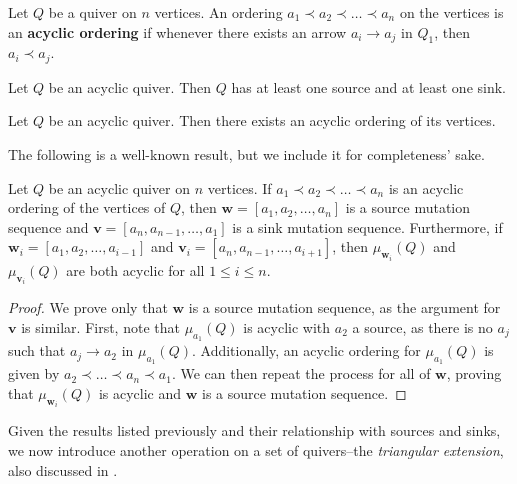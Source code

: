 \documentclass[ALCO,Unicode]{cedram}
\newcommand{\bw}{{\boldsymbol{w}}}
\newcommand{\bv}{{\boldsymbol{v}}}
\begin{document}
\begin{defi}{\cite{MR3822733}} \label{def-acyclic-ordering}
    Let $Q$ be a quiver on $n$ vertices.
    An ordering $a_1 \prec a_2 \prec \dots \prec a_n$ on the vertices is an \textbf{acyclic ordering} if whenever there exists an arrow $a_i \to a_j$ in $Q_1$, then $a_i \prec a_j$.
\end{defi}

\begin{prop}{\cite[Proposition 3.1.1]{MR3822733}} \label{prop-acyclic-source-sink}
    Let $Q$ be an acyclic quiver.
    Then $Q$ has at least one source and at least one sink.
\end{prop}

\begin{prop}{\cite[Proposition 3.1.2]{MR3822733}} \label{prop-acyclic-ordering}
    Let $Q$ be an acyclic quiver.
    Then there exists an acyclic ordering of its vertices.
\end{prop}

The following is a well-known result, but we include it for completeness' sake.

\begin{lemm} \label{lem-acyclic-source-sink}
    Let $Q$ be an acyclic quiver on $n$ vertices.
    If $a_1 \prec a_2 \prec \dots \prec a_n$ is an acyclic ordering of the vertices of $Q$, then $\bw = [a_1, a_2, \dots, a_n]$ is a source mutation sequence and $\bv = [a_n, a_{n-1}, \dots, a_1]$ is a sink mutation sequence.
    Furthermore, if $\bw_i = [a_1, a_2, \dots, a_{i-1}]$ and $\bv_i = [a_n, a_{n-1}, \dots, a_{i+1}]$, then $\mu_{\bw_i}(Q)$ and $\mu_{\bv_i}(Q)$ are both acyclic for all $1 \leq i \leq n$.
\end{lemm}


\begin{proof}
    We prove only that $\bw$ is a source mutation sequence, as the argument for $\bv$ is similar.
    First, note that $\mu_{a_1}(Q)$ is acyclic with $a_2$ a source, as there is no $a_j$ such that $a_j \to a_2$ in $\mu_{a_1}(Q)$.
    Additionally, an acyclic ordering for $\mu_{a_1}(Q)$ is given by $a_2 \prec \dots \prec a_n \prec a_1$.
    We can then repeat the process for all of $\bw$, proving that $\mu_{\bw_i}(Q)$ is acyclic and $\bw$ is a source mutation sequence.
\end{proof}

Given the results listed previously and their relationship with sources and sinks, we now introduce another operation on a set of quivers--the \textit{triangular extension}, also discussed in \cite{bucher_banff_2021, kontsevich_stability_2008, ladkani_cluster_2013}.
\end{document}
